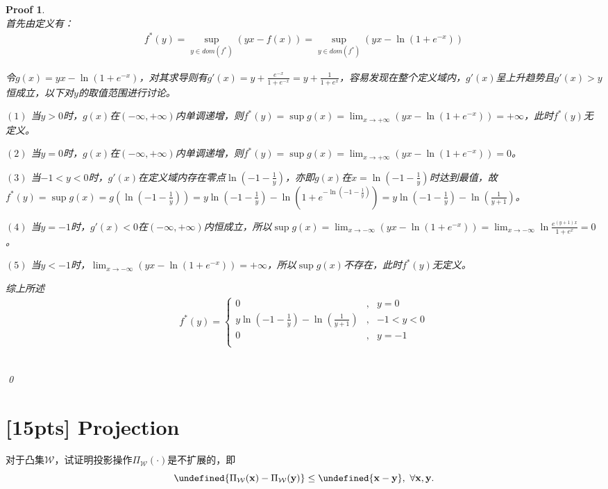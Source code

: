 \documentclass[a4paper,UTF8]{article}
\let\norm\undefined %
\DeclarePairedDelimiter\norm{\lVert}{\rVert}
\numberwithin{equation}{section}
\newtheorem*{myProof}{Proof}
\begin{document}
\begin{myProof}~\\

首先由定义有：
\begin{eqnarray*}
	f^*(y) = \sup_{y \in dom(f^*)} (yx - f(x)) = \sup_{y \in dom(f^*)} (yx - \ln(1 + e^{-x}))
\end{eqnarray*}

令$g(x) = yx - \ln(1 + e^{-x})$，对其求导则有$g'(x) = y + \frac{e^{-x}}{1 + e^{-x}} = y + \frac{1}{1 + e^x}$，容易发现在整个定义域内，$g'(x)$呈上升趋势且$g'(x) > y$恒成立，以下对$y$的取值范围进行讨论。

$(1)$  当$y > 0$时，$g(x)$在$(-\infty, +\infty)$内单调递增，则$f^*(y) = \sup g(x) = \lim_{x \rightarrow +\infty} (yx - \ln(1 + e^{-x})) = +\infty$，此时$f^*(y)$无定义。

$(2)$ 当$y = 0$时，$g(x)$在$(-\infty, +\infty)$内单调递增，则$f^*(y) = \sup g(x) = \lim_{x \rightarrow +\infty} (yx - \ln(1 + e^{-x})) = 0$。

$(3)$ 当$-1 < y < 0$时，$g'(x)$在定义域内存在零点$\ln(-1 - \frac{1}{y})$，亦即$g(x)$在$x=\ln(-1 - \frac{1}{y})$时达到最值，故$f^*(y) = \sup g(x) = g(\ln(-1 - \frac{1}{y})) = y \ln(-1 - \frac{1}{y}) - \ln \left( 1 + e^{-\ln(-1 - \frac{1}{y})} \right) = y \ln(-1 - \frac{1}{y}) - \ln \left( \frac{1}{y+1} \right)$。

$(4)$ 当$y = -1$时，$g'(x) < 0$在$(-\infty, +\infty)$内恒成立，所以$\sup g(x) = \lim_{x \rightarrow -\infty} ( yx - \ln(1 + e^{-x}) ) = \lim_{x \rightarrow -\infty} \ln \frac{e^{(y+1)x}}{1+e^x} = 0$。

$(5)$ 当$y < -1$时，$\lim_{x \rightarrow -\infty} ( yx - \ln(1 + e^{-x}) ) = +\infty$，所以$\sup g(x)$不存在，此时$f^*(y)$无定义。

综上所述
\begin{eqnarray*}
f^*(y) = \left\{
\begin{aligned}
	0 &,& y = 0 \\
	y \ln(-1 - \frac{1}{y}) - \ln \left( \frac{1}{y+1} \right) &,& -1 < y < 0 \\
	0 &,& y = -1 \\
\end{aligned}
\right.
\end{eqnarray*}

	~\\	
	\qed
\end{myProof}

\newpage
\section{[15pts] Projection}
\noindent 对于凸集$\mathcal{W}$，试证明投影操作$\Pi_{\mathcal{W}}(\cdot)$是不扩展的，即
\[
\norm{\Pi_{\mathcal{W}}(\mathbf{x})-\Pi_{\mathcal{W}}(\mathbf{y})} \leq \norm{\mathbf{x} - \mathbf{y}}, \ \forall \mathbf{x}, \mathbf{y}.
\]
\end{document}
